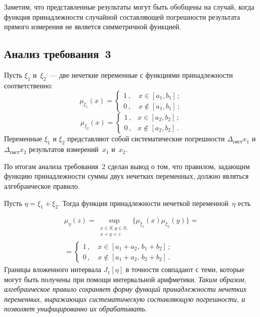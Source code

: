 \begin{multicols}{2}
  Заметим, что представленные результаты могут быть обобщены на случай, 
когда функция принадлежности случайной составляющей погрешности 
результата прямого измерения не является сим\-мет\-рич\-ной функцией. 

\subsection{Анализ требования~3} %
    
    Пусть $\xi_1$ и~$\xi_2$~--- две нечеткие переменные с функциями 
принадлежности соответственно:
    $$
    \mu_{\xi_1}(x)=\begin{cases}
    1\,, &\ x\in [a_1,b_1]\,;\\
    0\,, &\ x\not\in [a_1,b_1]\,;
    \end{cases}
    $$
    $$
    \mu_{\xi_2}(x)=\begin{cases}
    1\,, & x\in [a_2,b_2]\,;\\
    0\,, & x\not\in [a_2,b_2]\,.
    \end{cases}
    $$
Переменные    $\xi_1$ и $\xi_2$ представляют собой систематические погрешности 
$\Delta_{\mathrm{сист}} x_1$ и $\Delta_{\mathrm{сист}}x_2$ результатов 
измерений~$x_1$ и~$x_2$.
  
  По итогам анализа требования~2 сделан вывод о том, что правилом, 
задающим функцию принадлежности суммы двух нечетких переменных, 
должно являться алгебраическое правило.
  
  Пусть $\eta=\xi_1+\xi_2$. Тогда функция при\-над\-леж\-ности нечеткой 
переменной~$\eta$ есть 

\noindent
  \begin{multline*}
  \mu_\eta (z) =\sup\limits_{\substack{{x\in S, y\in 
S,}\\{x+y=z}}}\{\mu_{\xi_1}(x)\mu_{\xi_2}(y)\} ={}\\
{}=
  \begin{cases}
  1\,, &\ x\in [a_1+a_2,\,b_1+b_2]\,;\\
  0\,, &\ x\not\in [a_1+a_2,\,b_2+b_2]\,.
  \end{cases}
  \end{multline*}
  \noindent
  Границы вложенного интервала $J_1[\eta]$ в точности совпадают с теми, 
которые могут быть получены при помощи интервальной арифметики. 
\textit{Таким образом, алгебраическое правило сохраняет форму функций 
принадлежности нечетких переменных, вы\-ра\-жа\-ющих систематическую 
составляющую погрешности, и позволяет унифицированно их обрабатывать}.
  

\end{multicols}
